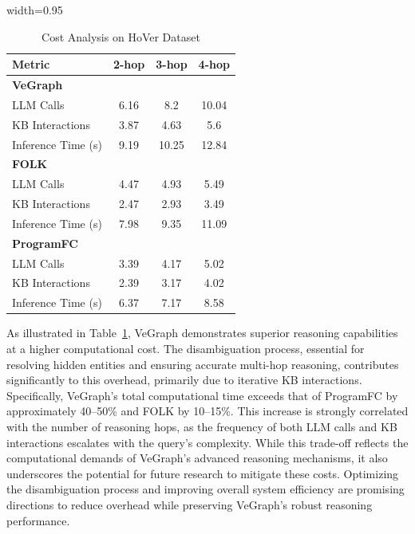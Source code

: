 \documentclass[11pt]{article}
\begin{document}
\begin{table}[H]
\centering
\begin{adjustbox}{width=0.95\columnwidth}
\begin{tabular}{lccc}
\hline
\hline
\textbf{Metric}              & \textbf{2-hop} & \textbf{3-hop} & \textbf{4-hop} \\ \hline
\multicolumn{4}{l}{\textbf{VeGraph}}                                 \\
LLM Calls                    & 6.16           & 8.2            & 10.04         \\
KB Interactions              & 3.87           & 4.63           & 5.6           \\
Inference Time (s)           & 9.19           & 10.25          & 12.84         \\ \hline
\multicolumn{4}{l}{\textbf{FOLK}}                                    \\
LLM Calls                    & 4.47           & 4.93           & 5.49          \\
KB Interactions              & 2.47           & 2.93           & 3.49          \\
Inference Time (s)           & 7.98           & 9.35           & 11.09         \\ \hline
\multicolumn{4}{l}{\textbf{ProgramFC}}                               \\
LLM Calls                    & 3.39           & 4.17           & 5.02          \\
KB Interactions              & 2.39           & 3.17           & 4.02          \\
Inference Time (s)           & 6.37           & 7.17           & 8.58          \\ \hline
\hline
\end{tabular}
\end{adjustbox}
\caption{Cost Analysis on HoVer Dataset}
\label{tab:cost_analysis}
\end{table}

As illustrated in Table~\ref{tab:cost_analysis}, VeGraph demonstrates superior reasoning capabilities at a higher computational cost. The disambiguation process, essential for resolving hidden entities and ensuring accurate multi-hop reasoning, contributes significantly to this overhead, primarily due to iterative KB interactions. Specifically, VeGraph's total computational time exceeds that of ProgramFC by approximately 40--50\% and FOLK by 10--15\%. This increase is strongly correlated with the number of reasoning hops, as the frequency of both LLM calls and KB interactions escalates with the query's complexity. While this trade-off reflects the computational demands of VeGraph's advanced reasoning mechanisms, it also underscores the potential for future research to mitigate these costs. Optimizing the disambiguation process and improving overall system efficiency are promising directions to reduce overhead while preserving VeGraph's robust reasoning performance.
\end{document}
